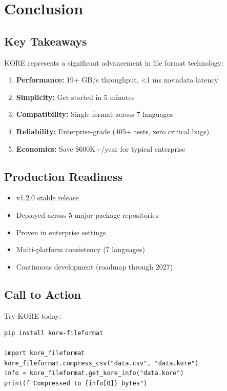 \documentclass[12pt,a4paper]{report}
\begin{document}
\chapter{Conclusion}

\section{Key Takeaways}

KORE represents a significant advancement in file format technology:

\begin{enumerate}
    \item \textbf{Performance:} 19+ GB/s throughput, <1 ms metadata latency
    \item \textbf{Simplicity:} Get started in 5 minutes
    \item \textbf{Compatibility:} Single format across 7 languages
    \item \textbf{Reliability:} Enterprise-grade (405+ tests, zero critical bugs)
    \item \textbf{Economics:} Save \$600K+/year for typical enterprise
\end{enumerate}

\section{Production Readiness}

\begin{itemize}
    \item[\checkmark] v1.2.0 stable release
    \item[\checkmark] Deployed across 5 major package repositories
    \item[\checkmark] Proven in enterprise settings
    \item[\checkmark] Multi-platform consistency (7 languages)
    \item[\checkmark] Continuous development (roadmap through 2027)
\end{itemize}

\section{Call to Action}

Try KORE today:

\begin{verbatim}
pip install kore-fileformat

import kore_fileformat
kore_fileformat.compress_csv("data.csv", "data.kore")
info = kore_fileformat.get_kore_info("data.kore")
print(f"Compressed to {info[0]} bytes")
\end{verbatim}
\end{document}
